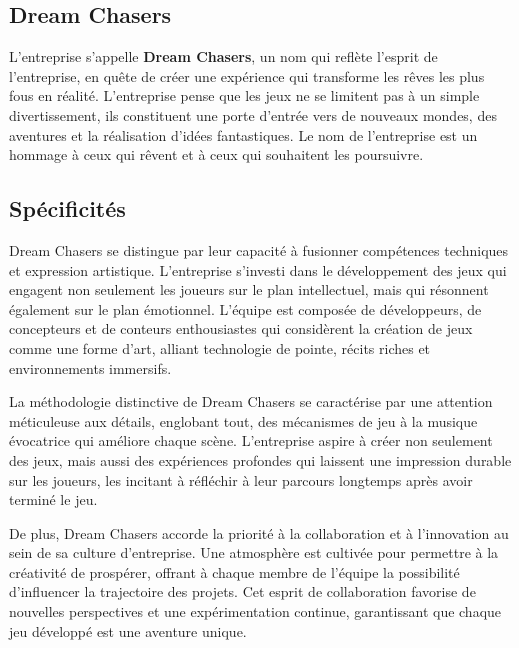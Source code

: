 \documentclass{article}
\begin{document}
\subsection{Dream Chasers}\hfill

L’entreprise s'appelle \textbf{Dream Chasers}, un nom qui reflète l'esprit de l'entreprise, en quête de créer une expérience qui transforme les rêves les plus fous en réalité. L’entreprise pense que les jeux ne se limitent pas à un simple divertissement, ils constituent une porte d'entrée vers de nouveaux mondes, des aventures et la réalisation d'idées fantastiques. Le nom de l’entreprise est un hommage à ceux qui rêvent et à ceux qui souhaitent les poursuivre. 





\subsection{Spécificités}\hfill

Dream Chasers se distingue par leur capacité à fusionner compétences techniques et expression artistique. L’entreprise s’investi dans le développement des jeux qui engagent non seulement les joueurs sur le plan intellectuel, mais qui résonnent également sur le plan émotionnel. L’équipe est composée de développeurs, de concepteurs et de conteurs enthousiastes qui considèrent la création de jeux comme une forme d'art, alliant technologie de pointe, récits riches et environnements immersifs.

La méthodologie distinctive de Dream Chasers se caractérise par une attention méticuleuse aux détails, englobant tout, des mécanismes de jeu à la musique évocatrice qui améliore chaque scène. L’entreprise aspire à créer non seulement des jeux, mais aussi des expériences profondes qui laissent une impression durable sur les joueurs, les incitant à réfléchir à leur parcours longtemps après avoir terminé le jeu. 

De plus, Dream Chasers accorde la priorité à la collaboration et à l’innovation au sein de sa culture d’entreprise. Une atmosphère est cultivée pour permettre à la créativité de prospérer, offrant à chaque membre de l'équipe la possibilité d'influencer la trajectoire des projets. Cet esprit de collaboration favorise de nouvelles perspectives et une expérimentation continue, garantissant que chaque jeu développé est une aventure unique.
\end{document}
